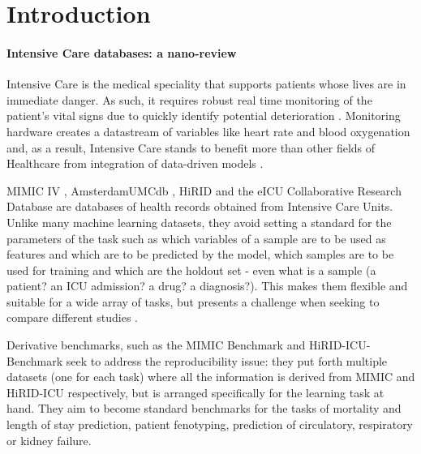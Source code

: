 
\section{Introduction}



\paragraph{Intensive Care databases: a nano-review}
\label{sec:datasets}

Intensive Care is the medical speciality that supports patients whose lives are in immediate danger.
As such, it requires robust real time monitoring of the patient's vital signs due to quickly identify potential deterioration \cite{Bailey2013trial, Blount2010Real, Bockholt2022Real, Dimitrios1999Distributed, Fried2000Some, Mao2012integrated, Prgomet2016Vital, Vincent2018Improving}.
Monitoring hardware creates a datastream of variables like heart rate and blood oxygenation and, as a result, Intensive Care stands to benefit more than other fields of Healthcare from integration of data-driven models \cite{nunezreizBigDataAnalysis2019}.

MIMIC IV \cite{johnsonMIMICIVFreelyAccessible2023}, AmsterdamUMCdb \cite{amsterdamumcdb-a}, HiRID \cite{yecheHiRIDICUBenchmarkComprehensiveMachine} and the eICU Collaborative Research Database \cite{pollard2018a} are databases of health records obtained from Intensive Care Units.
Unlike many machine learning datasets, they avoid setting a standard for the parameters of the task such as which variables of a sample are to be used as features and which are to be predicted by the model, which samples are to be used for training and which are the holdout set - even what is a sample (a patient? an ICU admission? a drug? a diagnosis?). This makes them flexible and suitable for a wide array of tasks, but presents a challenge when seeking to compare different studies \cite{mcdermottReproducibilityMachineLearning2021}.

Derivative benchmarks, such as the MIMIC Benchmark \cite{harutyunyanMultitaskLearningBenchmarking2019} and HiRID-ICU-Benchmark \cite{yecheHiRIDICUBenchmarkComprehensiveMachine} seek to address the reproducibility issue: they put forth multiple datasets (one for each task) where all the information is derived from MIMIC and HiRID-ICU respectively, but is arranged specifically for the learning task at hand. They aim to become standard benchmarks for the tasks of mortality and length of stay prediction, patient fenotyping, prediction of circulatory, respiratory or kidney failure.

